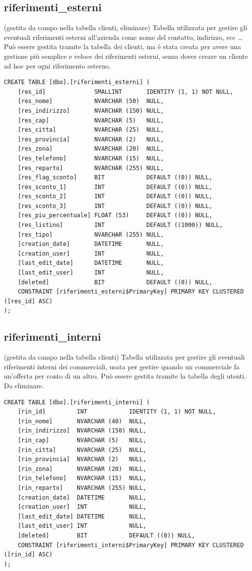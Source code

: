 \documentclass[12pt]{article}
\begin{document}
\subsection{riferimenti\_esterni} (gestita da campo nella tabella clienti, eliminare)
Tabella utilizzata per gestire gli eventuali riferimenti esterni all'azienda come nome del contatto, indirizzo, ecc \dots
Può essere gestita tramite la tabella dei clienti,
ma è stata creata per avere una gestione più semplice e
veloce dei riferimenti esterni, senza dover creare un cliente ad hoc per ogni riferimento esterno.
\begin{lstlisting}
CREATE TABLE [dbo].[riferimenti_esterni] (
    [res_id]              SMALLINT       IDENTITY (1, 1) NOT NULL,
    [res_nome]            NVARCHAR (50)  NULL,
    [res_indirizzo]       NVARCHAR (150) NULL,
    [res_cap]             NVARCHAR (5)   NULL,
    [res_citta]           NVARCHAR (25)  NULL,
    [res_provincia]       NVARCHAR (2)   NULL,
    [res_zona]            NVARCHAR (20)  NULL,
    [res_telefono]        NVARCHAR (15)  NULL,
    [res_reparto]         NVARCHAR (255) NULL,
    [res_flag_sconto]     BIT            DEFAULT ((0)) NULL,
    [res_sconto_1]        INT            DEFAULT ((0)) NULL,
    [res_sconto_2]        INT            DEFAULT ((0)) NULL,
    [res_sconto_3]        INT            DEFAULT ((0)) NULL,
    [res_piu_percentuale] FLOAT (53)     DEFAULT ((0)) NULL,
    [res_listino]         INT            DEFAULT ((1000)) NULL,
    [res_tipo]            NVARCHAR (255) NULL,
    [creation_date]       DATETIME       NULL,
    [creation_user]       INT            NULL,
    [last_edit_date]      DATETIME       NULL,
    [last_edit_user]      INT            NULL,
    [deleted]             BIT            DEFAULT ((0)) NULL,
    CONSTRAINT [riferimenti_esterni$PrimaryKey] PRIMARY KEY CLUSTERED ([res_id] ASC)
);
\end{lstlisting}

\subsection{riferimenti\_interni} (gestita da campo nella tabella clienti)
Tabella utilizzata per gestire gli eventuali riferimenti interni dei commerciali,
usata per gestire quando un commerciale fa un'offerta per conto di un altro.
Può essere gestita tramite la tabella degli utenti.
Da eliminare.
\begin{lstlisting}
CREATE TABLE [dbo].[riferimenti_interni] (
    [rin_id]         INT            IDENTITY (1, 1) NOT NULL,
    [rin_nome]       NVARCHAR (40)  NULL,
    [rin_indirizzo]  NVARCHAR (150) NULL,
    [rin_cap]        NVARCHAR (5)   NULL,
    [rin_citta]      NVARCHAR (25)  NULL,
    [rin_provincia]  NVARCHAR (2)   NULL,
    [rin_zona]       NVARCHAR (20)  NULL,
    [rin_telefono]   NVARCHAR (15)  NULL,
    [rin_reparto]    NVARCHAR (255) NULL,
    [creation_date]  DATETIME       NULL,
    [creation_user]  INT            NULL,
    [last_edit_date] DATETIME       NULL,
    [last_edit_user] INT            NULL,
    [deleted]        BIT            DEFAULT ((0)) NULL,
    CONSTRAINT [riferimenti_interni$PrimaryKey] PRIMARY KEY CLUSTERED ([rin_id] ASC)
);
\end{lstlisting}
\end{document}
